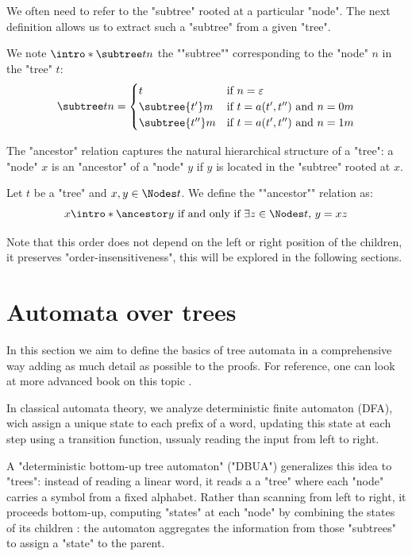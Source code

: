 \documentclass[twoside]{article}
\begin{document}
We often need to refer to the "subtree" rooted at a particular "node". The next definition allows us to
extract such a "subtree" from a given "tree".

\begin{definition}
	\AP We note $\intro* \subtree t n$ the ""subtree"" corresponding to the "node" $n$ in the "tree" $t$:
	\[
		\subtree t n =   \begin{cases}
			t                & \text{if }  n = \varepsilon                  \\
			\subtree {t'} m  & \text{if } t = a(t',t'') \text{ and } n = 0m \\
			\subtree {t''} m & \text{if } t = a(t',t'') \text{ and } n = 1m
		\end{cases}
	\]
\end{definition}

The "ancestor" relation captures the natural hierarchical structure of a "tree": a "node" $x$ is an "ancestor"
of a "node" $y$ if $y$ is located in the "subtree" rooted at $x$.

\begin{definition}
	\AP Let $t$ be a "tree" and $x, y \in \Nodes t$. We define the ""ancestor"" relation as:
	\[
		x \intro* \ancestor y \tiff \exists z \in \Nodes t,\, y = xz
	\]
\end{definition}

\begin{remark}
	Note that this order does not depend on the left or right position of the children, \ie it preserves
	"order-insensitiveness", this will be explored in the following sections.
\end{remark}


\section{Automata over trees}\label{sec:automata}

In this section we aim to define the basics of tree automata in a comprehensive way adding as much detail as possible to the proofs. For reference,
one can look at more advanced book on this topic \cite{tata,Thomas1997,bookautomata}.

In classical automata theory, we analyze deterministic finite automaton (DFA), wich assign a unique state to each prefix of
a word, updating this state at each step using a transition function, ussualy reading the input from left to right.

A "deterministic bottom-up tree automaton" ("DBUA") generalizes this idea to "trees": instead of reading a linear word, it reads a
a "tree" where each "node" carries a symbol from a fixed alphabet. Rather than scanning from left to right, it proceeds
bottom-up, computing "states" at each "node" by combining the states of its children :
the automaton aggregates the information from those "subtrees" to assign a "state" to the parent.
\end{document}

